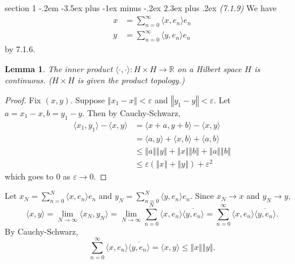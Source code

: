 \documentclass[12pt]{article}
\makeatletter
\theoremstyle{norm}
\newtheorem{lem}[thm]{Lemma}
\newcommand{\R}[0]{\mathbb{R}}
\newcommand{\ep}[0]{\varepsilon}
\newcommand{\pa}[1]{\left( {#1} \right)}
\newcommand{\an}[1]{\langle {#1}\rangle}
\newcommand{\ve}[1]{\left\Vert {#1}\right\Vert}
\newcommand{\ol}[1]{\overline{#1}}
\newcommand{\iy}[0]{\infty}
\newenvironment{problem}{\@startsection
       {section}
       {1}
       {-.2em}
       {-3.5ex plus -1ex minus -.2ex}
       {2.3ex plus .2ex}
       {\pagebreak[3]%
       \large\bf\noindent{Problem }
       }
       }
       {%
       }
\makeatother
\begin{document}
\begin{problem}{\it(7.1.9)}
We have
\begin{align*}
x&=\sum_{n=0}^{\iy} \an{x,e_n} e_n\\
y&=\sum_{n=0}^{\iy}\an{y,e_n} e_n
\end{align*}
by 7.1.6. 

\begin{lem}
The inner product $\an{\cdot, \cdot}:H\times H\to \R$ on a Hilbert space $H$ is continuous. ($H\times H$ is given the product topology.)
\end{lem}
\begin{proof}
Fix $(x,y)$. Suppose $\ve{x_1-x}<\ep$ and $\ve{y_1-y}< \ep$. Let $a=x_1-x,b=y_1-y$.  Then by Cauchy-Schwarz,
\begin{align*}
\an{x_1,y_1}-\an{x,y}&=\an{x+a,y+b}-\an{x,y}\\
&=\an{a,y}+\an{x,b}+\an{a,b} \\
&\le{\ve{a}{\ve{y}}}+{\ve{x}{\ve{b}}}+{\ve{a}{\ve{b}}}\\ &\le{\ep}\pa{{\ve{x}}+{\ve{y}}}+\ep^2
\end{align*}
which goes to 0 as $\ep\to 0$.
\end{proof}
Let $x_N=\sum_{n=0}^N \an{x,e_n}e_n$ and $y_N=\sum_{n=0}^N \an{y,e_n}e_n$. Since $x_N\to x$ and $y_N\to y$,
\[
\an{x,y}=\lim_{N\to \iy}\an{x_N,y_N}
=\lim_{N\to \iy}\sum_{n=0}^N \an{x,e_n}\ol{\an{y,e_n}}
=\sum_{n=0}^{\iy}\an{x,e_n}\ol{\an{y,e_n}}.
\]
By Cauchy-Schwarz,
\[
\sum_{n=0}^{\iy}\an{x,e_n}\ol{\an{y,e_n}}=\an{x,y}\le \ve{x}\ve{y}.
\]
\end{problem}
\end{document}
